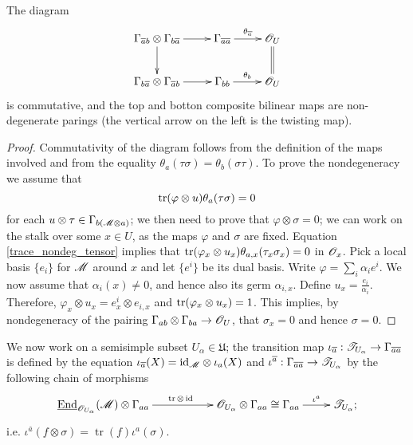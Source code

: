 \begin{proposition}
The diagram
$$
\xymatrix{
\Gamma_{\overline{a}b}\otimes \Gamma_{b\overline{a}}\ar[d]\ar[r] & \Gamma_{\overline{a}\overline{a}}\ar[r]^-{\theta_{\overline{a}}} & \scr{O}_U\ar@{=}[d] \\
\Gamma_{b\overline{a}}\otimes \Gamma_{\overline{a}b}\ar[r] & \Gamma_{bb} \ar[r]^{\theta_b} & \scr{O}_U}
$$
is commutative, and the top and botton composite bilinear maps are non-degenerate parings (the vertical arrow on the left is the twisting map).
\end{proposition}
\begin{proof}
Commutativity of the diagram follows from the definition of the maps involved and from the equality $\theta_a(\tau \sigma )=\theta_b(\sigma \tau )$. To prove the nondegeneracy we assume that
\begin{equation}\label{trace_nondeg_tensor}
\operatorname{tr}(\varphi \otimes u)\theta_a(\tau \sigma )=0
\end{equation}
for each $u\otimes \tau \in \Gamma_{b(\mathscr{M}\otimes a)}$; we then need to prove that $\varphi \otimes \sigma =0$; we can work on the stalk over some $x\in U$, as the maps $\varphi$ and $\sigma$ are fixed. Equation \eqref{trace_nondeg_tensor} implies that $\operatorname{tr}(\varphi_x\otimes u_x)\theta_{a,x}(\tau_x\sigma_x)=0$ in $\mathscr{O}_x$. Pick a local basis $\{e_i\}$ for $\mathscr{M}$ around $x$ and let $\{e^i\}$ be its dual basis. Write $\varphi =\sum_i\alpha_ie^i$. We now assume that $\alpha_i(x)\neq 0$, and hence also its germ $\alpha_{i,x}$. Define $u_x=\frac{e_i}{\alpha_i}$. Therefore, $\varphi_x\otimes u_x=e^i_x\otimes e_{i,x}$ and $\operatorname{tr}(\varphi_x\otimes u_x)=1$. This implies, by nondegeneracy of the pairing $\Gamma_{ab}\otimes \Gamma_{ba}\to \mathscr{O}_U$, that $\sigma_x=0$ and hence $\sigma =0$. 
\end{proof}

We now work on a semisimple subset $U_\alpha \in \mathfrak{U}$; the transition map $\iota_{\overline{a}}:\mathscr{T}_{U_\alpha}\to \Gamma_{\overline{a}\overline{a}}$ is defined by the equation $\iota_{\overline{a}}(X) = \text{id}_{\mathscr{M}}\otimes \iota_a (X)$ and $\iota^{\overline{a}}:\Gamma_{\overline{a}\overline{a}}\to \mathscr{T}_{U_\alpha}$ by the following chain of morphisms
$$
\xymatrix{
\underline{\operatorname{End}}_{\scr{O}_{U_\alpha}}(\scr{M})\otimes \Gamma_{aa} \ar[rr]^{\operatorname{tr}\otimes \operatorname{id}} & & \scr{O}_{U_\alpha}\otimes \Gamma_{aa}\cong \Gamma_{aa} \ar[r]^-{\iota^a} & \scr{T}_{U_\alpha};}
$$
i.e. $\iota^{\overline{a}}(f\otimes \sigma )=\operatorname{tr}(f)\iota^a(\sigma )$.

